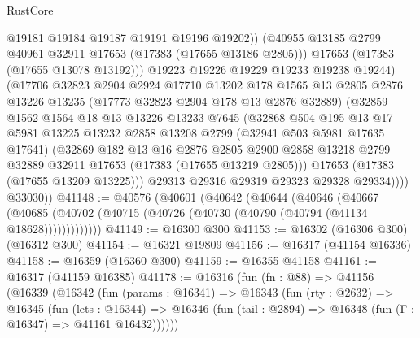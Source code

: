 \begin{lexlean}{RustCore}
\begin{coremodule}
                    @19181
                    @19184
                    @19187
                    @19191
                    @19196
                    @19202))
                (@40955 @13185 @2799 @40961 @32911 @17653 (@17383 (@17655 @13186 @2805)))
                @17653
                (@17383 (@17655 @13078 @13192)))
              @19223
              @19226
              @19229
              @19233
              @19238
              @19244)
            (@17706
              @32823
              @2904
              @2924
              @17710
              @13202
              @178
              @1565
              @13
              @2805
              @2876
              @13226
              @13235
              (@17773 @32823 @2904 @178 @13 @2876 @32889)
              (@32859
                @1562
                @1564
                @18
                @13
                @13226
                @13233
                @7645
                (@32868
                  @504
                  @195
                  @13
                  @17
                  @5981
                  @13225
                  @13232
                  @2858
                  @13208
                  @2799
                  (@32941 @503 @5981 @17635 @17641)
                  (@32869
                    @182
                    @13
                    @16
                    @2876
                    @2805
                    @2900
                    @2858
                    @13218
                    @2799
                    @32889
                    @32911
                    @17653
                    (@17383 (@17655 @13219 @2805)))
                  @17653
                  (@17383 (@17655 @13209 @13225)))
                @29313
                @29316
                @29319
                @29323
                @29328
                @29334))))
        @33030))
@41148 := @40576
    (@40601
      (@40642
        (@40644
          (@40646
            (@40667
              (@40685 (@40702 (@40715 (@40726 (@40730 (@40790 (@40794 (@41134 @18628)))))))))))))
@41149 := @16300 @300
@41153 := @16302 (@16306 @300) (@16312 @300)
@41154 := @16321 @19809
@41156 := @16317 (@41154 @16336)
@41158 := @16359 (@16360 @300)
@41159 := @16355 @41158
@41161 := @16317 (@41159 @16385)
@41178 := @16316
    (fun (fn : @88) =>
    @41156
      (@16339
        (@16342
          (fun (params : @16341) =>
          @16343
            (fun (rty : @2632) =>
            @16345
              (fun (lets : @16344) =>
              @16346 (fun (tail : @2894) => @16348 (fun (Γ : @16347) => @41161 @16432))))))

\end{coremodule}
\end{lexlean}
